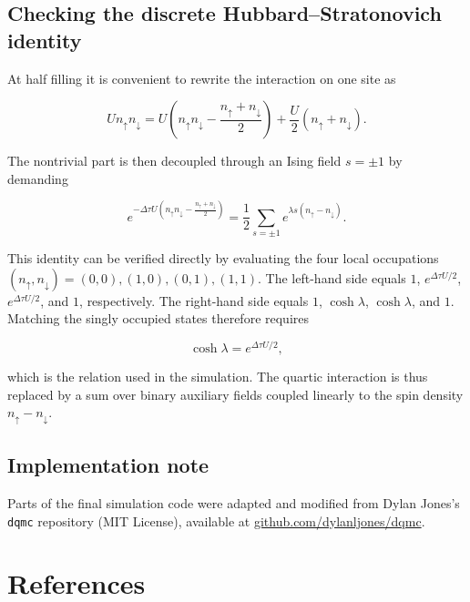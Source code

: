\documentclass[9pt,a4paper,twocolumn,twoside]{rho-class/rho}
\begin{document}
\subsection{Checking the discrete Hubbard--Stratonovich identity}

At half filling it is convenient to rewrite the interaction on one site as

\begin{equation}
U n_{\uparrow}n_{\downarrow}
=
U\left(n_{\uparrow}n_{\downarrow}-\frac{n_{\uparrow}+n_{\downarrow}}{2}\right)
+\frac{U}{2}(n_{\uparrow}+n_{\downarrow}).
\end{equation}

The nontrivial part is then decoupled through an Ising field $s=\pm1$ by demanding

\begin{equation}
e^{-\Delta\tau U(n_\uparrow n_\downarrow-\frac{n_\uparrow+n_\downarrow}{2})}
=
\frac{1}{2}\sum_{s=\pm1}e^{\lambda s(n_\uparrow-n_\downarrow)}.
\end{equation}

This identity can be verified directly by evaluating the four local occupations $(n_\uparrow,n_\downarrow)=(0,0),(1,0),(0,1),(1,1)$. The left-hand side equals $1$, $e^{\Delta\tau U/2}$, $e^{\Delta\tau U/2}$, and $1$, respectively. The right-hand side equals $1$, $\cosh\lambda$, $\cosh\lambda$, and $1$. Matching the singly occupied states therefore requires

\begin{equation}
\cosh\lambda=e^{\Delta\tau U/2},
\end{equation}

which is the relation used in the simulation. The quartic interaction is thus replaced by a sum over binary auxiliary fields coupled linearly to the spin density $n_\uparrow-n_\downarrow$.

\subsection{Implementation note}

Parts of the final simulation code were adapted and modified from Dylan Jones's \texttt{dqmc} repository (MIT License), available at \href{https://github.com/dylanljones/dqmc}{github.com/dylanljones/dqmc}.

\section{References}

\printbibliography[heading=none]
\end{document}
